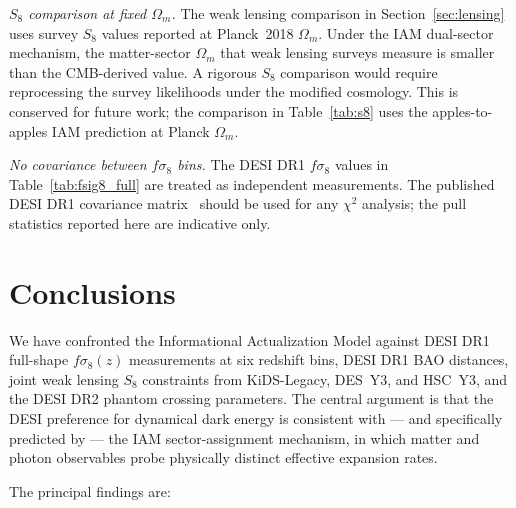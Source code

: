 \documentclass[12pt,a4paper]{article}
\begin{document}
\textit{$S_8$ comparison at fixed $\Omega_m$.}
The weak lensing comparison in Section~\ref{sec:lensing} uses survey
$S_8$ values reported at Planck~2018 $\Omega_m$.
Under the IAM dual-sector mechanism, the matter-sector $\Omega_m$ that
weak lensing surveys measure is smaller than the CMB-derived value.
A rigorous $S_8$ comparison would require reprocessing the survey
likelihoods under the modified cosmology.
This is conserved for future work; the comparison in Table~\ref{tab:s8}
uses the apples-to-apples IAM prediction at Planck $\Omega_m$.

\textit{No covariance between $f\sigma_8$ bins.}
The DESI DR1 $f\sigma_8$ values in Table~\ref{tab:fsig8_full} are treated
as independent measurements.
The published DESI DR1 covariance matrix~\citep{DESI2024DR1FS} should be
used for any $\chi^2$ analysis; the pull statistics reported here are
indicative only.


\section{Conclusions}
\label{sec:conclusions}

We have confronted the Informational Actualization Model against DESI DR1
full-shape $f\sigma_8(z)$ measurements at six redshift bins, DESI DR1 BAO
distances, joint weak lensing $S_8$ constraints from KiDS-Legacy, DES~Y3,
and HSC~Y3, and the DESI DR2 phantom crossing parameters.
The central argument is that the DESI preference for dynamical dark energy is
consistent with --- and specifically predicted by --- the IAM sector-assignment
mechanism, in which matter and photon observables probe physically distinct
effective expansion rates.

The principal findings are:
\end{document}
